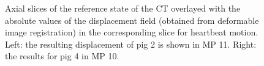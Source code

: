 \documentclass[type=dr, dr=rernat, accentcolor=tud7b,colorbacktitle, bigchapter, openright, twoside, 12pt ]{tudthesis}
\begin{document}
\begin{figure}[H]
\centering
{}
\caption{Axial slices of the reference state of the CT overlayed with the absolute values of the displacement field (obtained from 
deformable image registration) in the corresponding slice for heartbeat motion. Left: the resulting displacement of pig 2 is shown 
in MP 11. Right: the results for pig 4 in MP 10.}
\label{contour_plot_hb_pigs}
\end{figure}
 
\end{document}
